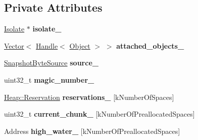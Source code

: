 \subsection*{Private Attributes}
\begin{DoxyCompactItemize}
\item 
\hyperlink{classv8_1_1internal_1_1_isolate}{Isolate} $\ast$ {\bfseries isolate\+\_\+}\hypertarget{classv8_1_1internal_1_1_deserializer_a1382ad0863b0ac0a93f8043c663cd9b9}{}\label{classv8_1_1internal_1_1_deserializer_a1382ad0863b0ac0a93f8043c663cd9b9}

\item 
\hyperlink{classv8_1_1internal_1_1_vector}{Vector}$<$ \hyperlink{classv8_1_1internal_1_1_handle}{Handle}$<$ \hyperlink{classv8_1_1internal_1_1_object}{Object} $>$ $>$ {\bfseries attached\+\_\+objects\+\_\+}\hypertarget{classv8_1_1internal_1_1_deserializer_afd860d81245c79ae7b0a10d3b8741b85}{}\label{classv8_1_1internal_1_1_deserializer_afd860d81245c79ae7b0a10d3b8741b85}

\item 
\hyperlink{classv8_1_1internal_1_1_snapshot_byte_source}{Snapshot\+Byte\+Source} {\bfseries source\+\_\+}\hypertarget{classv8_1_1internal_1_1_deserializer_a3d6b13b48bb12f13caedd1aa2cb8d6c1}{}\label{classv8_1_1internal_1_1_deserializer_a3d6b13b48bb12f13caedd1aa2cb8d6c1}

\item 
uint32\+\_\+t {\bfseries magic\+\_\+number\+\_\+}\hypertarget{classv8_1_1internal_1_1_deserializer_a860aedb84d38841878d53f6b1d6a3515}{}\label{classv8_1_1internal_1_1_deserializer_a860aedb84d38841878d53f6b1d6a3515}

\item 
\hyperlink{classv8_1_1internal_1_1_list}{Heap\+::\+Reservation} {\bfseries reservations\+\_\+} \mbox{[}k\+Number\+Of\+Spaces\mbox{]}\hypertarget{classv8_1_1internal_1_1_deserializer_a06ce97d13da3c68805a2d15804c895d0}{}\label{classv8_1_1internal_1_1_deserializer_a06ce97d13da3c68805a2d15804c895d0}

\item 
uint32\+\_\+t {\bfseries current\+\_\+chunk\+\_\+} \mbox{[}k\+Number\+Of\+Preallocated\+Spaces\mbox{]}\hypertarget{classv8_1_1internal_1_1_deserializer_ae86ac1d8c431a30a187eb9eada7f6d19}{}\label{classv8_1_1internal_1_1_deserializer_ae86ac1d8c431a30a187eb9eada7f6d19}

\item 
Address {\bfseries high\+\_\+water\+\_\+} \mbox{[}k\+Number\+Of\+Preallocated\+Spaces\mbox{]}\hypertarget{classv8_1_1internal_1_1_deserializer_ad69e03880f63a236802f51d570bb6295}{}\label{classv8_1_1internal_1_1_deserializer_ad69e03880f63a236802f51d570bb6295}


\end{DoxyCompactItemize}
